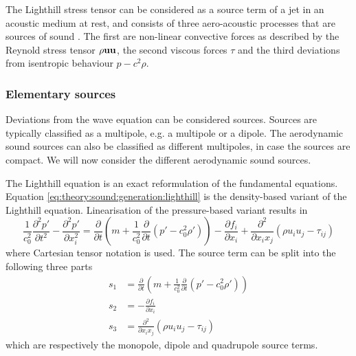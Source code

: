 The Lighthill stress tensor can be considered as a source term of a jet in an
acoustic medium at rest, and consists of three aero-acoustic processes that are
sources of sound \cite{Rienstra2017}. The first are non-linear convective forces
as described by the Reynold stress tensor $\rho \mathbf{u}\mathbf{u}$, the second
viscous forces $\tau$ and the third deviations from isentropic behaviour $p - c^2 \rho$.







\subsubsection*{Elementary sources}
Deviations from the wave equation can be considered sources. Sources are
typically classified as a multipole, e.g. a multipole or a dipole. The
aerodynamic sound sources can also be classified as different multipoles, in
case the sources are compact. We will now consider the different aerodynamic
sound sources.

The Lighthill equation is an exact reformulation of the fundamental equations.
Equation \eqref{eq:theory:sound:generation:lighthill} is the density-based
variant of the Lighthill equation. Linearisation of the pressure-based variant
results in
\begin{equation}
 \frac{1}{c_0^2}\frac{\partial^2 p'}{\partial t^2} - \frac{\partial^2 p'}{\partial x_i^2} = \frac{\partial}{\partial t} \left( m + \frac{1}{c_0^2}\frac{\partial}{\partial t}\left(p' - c_0^2 \rho' \right) \right) - \frac{\partial f_i}{\partial x_i} + \frac{\partial^2 }{\partial x_i x_j} \left( \rho u_i u_j - \tau_{ij} \right)
\end{equation}
where Cartesian tensor notation is used.
The source term can be split into the following three parts
\begin{align}
  s_1 &= \frac{\partial}{\partial t} \left( m + \frac{1}{c_0^2}\frac{\partial}{\partial t}\left(p' - c_0^2 \rho' \right) \right) \\
  s_2 &= - \frac{\partial f_i}{\partial x_i} \\
  s_3 &= \frac{\partial^2 }{\partial x_i x_j} \left( \rho u_i u_j - \tau_{ij} \right)
\end{align}
which are respectively the monopole, dipole and quadrupole source terms.


